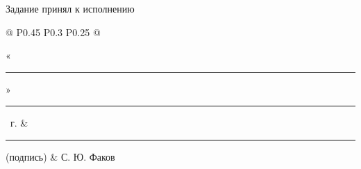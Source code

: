 \documentclass[14pt, a4paper]{extarticle}
\begin{document}
Задание принял к исполнению

{
\renewcommand{\arraystretch}{1.5}
\begin{tabularx}{\textwidth}{@{} P{0.45\textwidth} P{0.3\textwidth} P{0.25\textwidth} @{}}

    «\rule{0.8cm}{0.4pt}» \quad \rule{2cm}{0.4pt} ~г. &
    \centering \rule{3.5cm}{0.4pt} \par \footnotesize (подпись) &
    \hfill С. Ю. Факов                                           \\
\end{tabularx}
}
\end{document}
